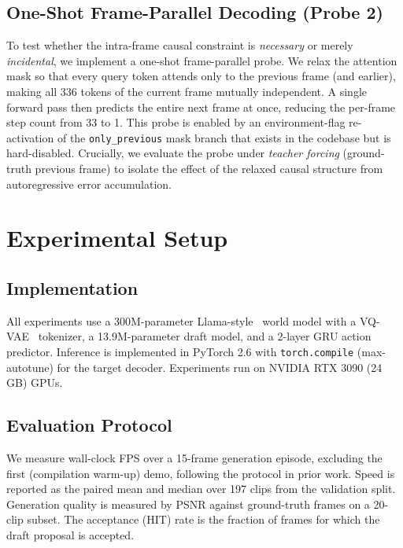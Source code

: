 \documentclass[10pt, twocolumn]{article}
\begin{document}
\subsection{One-Shot Frame-Parallel Decoding (Probe 2)}
To test whether the intra-frame causal constraint is \emph{necessary} or merely \emph{incidental}, we implement a one-shot frame-parallel probe. We relax the attention mask so that every query token attends only to the previous frame (and earlier), making all 336 tokens of the current frame mutually independent. A single forward pass then predicts the entire next frame at once, reducing the per-frame step count from 33 to 1. This probe is enabled by an environment-flag re-activation of the \texttt{only\_previous} mask branch that exists in the codebase but is hard-disabled. Crucially, we evaluate the probe under \emph{teacher forcing} (ground-truth previous frame) to isolate the effect of the relaxed causal structure from autoregressive error accumulation.

\section{Experimental Setup}
\label{sec:setup}

\subsection{Implementation}
All experiments use a 300M-parameter Llama-style~\cite{llama} world model with a VQ-VAE~\cite{vqvae} tokenizer, a 13.9M-parameter draft model, and a 2-layer GRU action predictor. Inference is implemented in PyTorch 2.6 with \texttt{torch.compile} (max-autotune) for the target decoder. Experiments run on NVIDIA RTX 3090 (24 GB) GPUs.

\subsection{Evaluation Protocol}
We measure wall-clock FPS over a 15-frame generation episode, excluding the first (compilation warm-up) demo, following the protocol in prior work. Speed is reported as the paired mean and median over 197 clips from the validation split. Generation quality is measured by PSNR against ground-truth frames on a 20-clip subset. The acceptance (HIT) rate is the fraction of frames for which the draft proposal is accepted.
\end{document}
